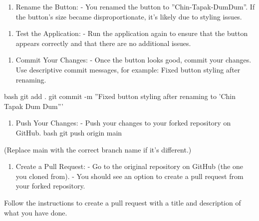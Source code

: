\documentclass{article} %
\begin{document}
\noindent 

\noindent 

\begin{enumerate}
\item  Rename the Button: - You renamed the button to ''Chin-Tapak-DumDum''. If the button's size became disproportionate, it's likely due to styling issues.
\end{enumerate}

\noindent 

\noindent 

\begin{enumerate}
\item  Test the Application: - Run the application again to ensure that the button appears correctly and that there are no additional issues.
\end{enumerate}

\noindent 

\noindent 

\begin{enumerate}
\item   Commit Your Changes: - Once the button looks good, commit your changes. Use descriptive commit messages, for example: Fixed button styling after renaming.
\end{enumerate}

\noindent bash git add . git commit -m ''Fixed button styling after renaming to 'Chin Tapak Dum Dum'''

\noindent 

\noindent 

\begin{enumerate}
\item  Push Your Changes: - Push your changes to your forked repository on GitHub. bash git push origin main
\end{enumerate}

\noindent (Replace main with the correct branch name if it's different.)

\noindent 

\noindent 

\begin{enumerate}
\item  Create a Pull Request: - Go to the original repository on GitHub (the one you cloned from). - You should see an option to create a pull request from your forked repository.
\end{enumerate}

\noindent Follow the instructions to create a pull request with a title and description of what you have done.
\end{document}
